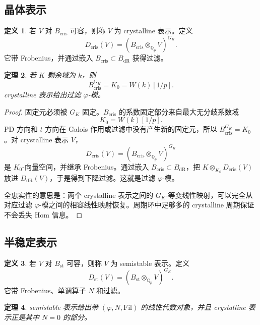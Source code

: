 \documentclass[11pt,a4paper,openany]{ctexbook}
\numberwithin{equation}{chapter}
\newcommand{\Q}{\mathbb{Q}}
\theoremstyle{plain}
\newtheorem{theorem}{定理}[chapter]
\theoremstyle{definition}
\newtheorem{definition}[theorem]{定义}
\theoremstyle{remark}
\begin{document}
\subsection{晶体表示}

\begin{definition}
若 $V$ 对 $B_{\mathrm{cris}}$ 可容，则称 $V$ 为 crystalline 表示。定义
\[
  D_{\mathrm{cris}}(V)=(B_{\mathrm{cris}}\otimes_{\Q_p}V)^{G_K}.
\]
它带 Frobenius，并通过嵌入 $B_{\mathrm{cris}}\subset B_{\mathrm{dR}}$ 获得过滤。
\end{definition}

\begin{theorem}
若 $K$ 剩余域为 $k$，则
\[
  B_{\mathrm{cris}}^{G_K}=K_0=W(k)[1/p].
\]
crystalline 表示给出过滤 $\varphi$-模。
\end{theorem}

\begin{proof}
固定元必须被 $G_K$ 固定。$B_{\mathrm{cris}}$ 的系数固定部分来自最大无分歧系数域
\[
  K_0=W(k)[1/p].
\]
PD 方向和 $t$ 方向在 Galois 作用或过滤中没有产生新的固定元，所以 $B_{\mathrm{cris}}^{G_K}=K_0$。对 crystalline 表示 $V$，
\[
  D_{\mathrm{cris}}(V)=(B_{\mathrm{cris}}\otimes_{\Q_p}V)^{G_K}
\]
是 $K_0$-向量空间，并继承 Frobenius。通过嵌入 $B_{\mathrm{cris}}\subset B_{\mathrm{dR}}$，把 $K\otimes_{K_0}D_{\mathrm{cris}}(V)$ 放进 $D_{\mathrm{dR}}(V)$，于是得到下降过滤。这就是过滤 $\varphi$-模。

全忠实性的意思是：两个 crystalline 表示之间的 $G_K$-等变线性映射，可以完全从对应过滤 $\varphi$-模之间的相容线性映射恢复。周期环中足够多的 crystalline 周期保证不会丢失 Hom 信息。
\end{proof}

\subsection{半稳定表示}

\begin{definition}
若 $V$ 对 $B_{\mathrm{st}}$ 可容，则称 $V$ 为 semistable 表示。定义
\[
  D_{\mathrm{st}}(V)=(B_{\mathrm{st}}\otimes_{\Q_p}V)^{G_K}.
\]
它带 Frobenius、单调算子 $N$ 和过滤。
\end{definition}

\begin{theorem}
semistable 表示给出带 $(\varphi,N,\mathrm{Fil})$ 的线性代数对象，并且 crystalline 表示正是其中 $N=0$ 的部分。
\end{theorem}
\end{document}
